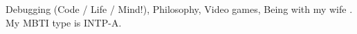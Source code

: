 %


\vspace{1mm}


Debugging (Code / Life / Mind!), Philosophy, Video games, Being with my wife
{\color{myred} \ioniconsFont {}}.
My MBTI type is INTP-A.


